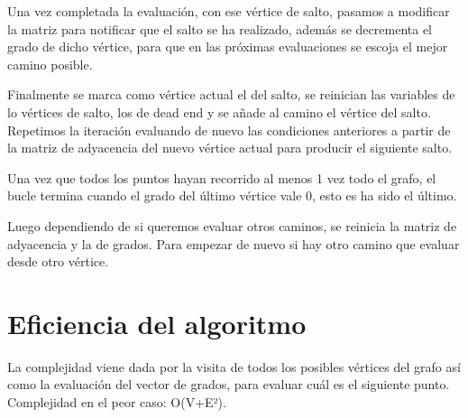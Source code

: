 Una vez completada la evaluación, con ese vértice de salto, pasamos a modificar la matriz para notificar que el salto se ha realizado, además se decrementa el grado de dicho vértice, para que en las próximas evaluaciones se escoja el mejor camino posible.

Finalmente se marca como vértice actual el del salto, se reinician las variables de lo vértices de salto, los de dead end y se añade al camino el vértice del salto. Repetimos la iteración evaluando de nuevo las condiciones anteriores a partir de la matriz de adyacencia del nuevo vértice actual para producir el siguiente salto.

Una vez que todos los puntos hayan recorrido al menos 1 vez todo el grafo, el bucle termina cuando el grado del último vértice vale 0, esto es ha sido el último.

Luego dependiendo de si queremos evaluar otros caminos, se reinicia la matriz de adyacencia y la de grados. Para empezar de nuevo si hay otro camino que evaluar desde otro vértice.


\section{Eficiencia del algoritmo}

La complejidad viene dada por la visita de todos los posibles vértices del grafo así como la evaluación del vector de grados, para evaluar cuál es el siguiente punto.
Complejidad en el peor caso: O(V+E²).









%



%


